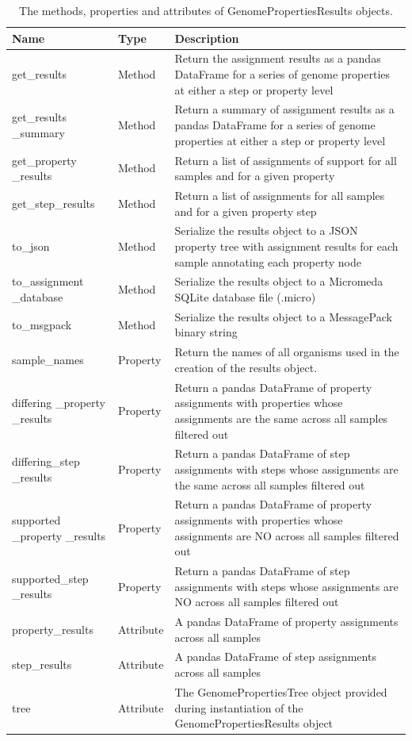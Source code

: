 \begin{longtable}{|p{2.7cm}|p{2cm}|p{10cm}|}
\caption{The methods, properties and attributes of GenomePropertiesResults objects.}
\label{tab:results-object}\\
\hline
\textbf{Name} & \textbf{Type} & \textbf{Description} \\ \hline
\endfirsthead
%
\endhead
%
get\_results & Method & Return the assignment results as a pandas DataFrame for a series of genome properties at either a step or property level \\ \hline
get\_results \_summary & Method & Return a summary of assignment results as a pandas DataFrame for a series of genome properties at either a step or property level \\ \hline
get\_property \_results & Method & Return a list of assignments of support for all samples and for a given property \\ \hline
get\_step\_results & Method & Return a list of assignments for all samples and for a given property step \\ \hline
to\_json & Method & Serialize the results object to a JSON property tree with assignment results for each sample annotating each property node \\ \hline
to\_assignment \_database & Method & Serialize the results object to a Micromeda SQLite database file (.micro) \\ \hline
to\_msgpack & Method & Serialize the results object to a MessagePack binary string \\ \hline
sample\_names & Property & Return the names of all organisms used in the creation of the results object. \\ \hline
differing \_property \_results & Property & Return a pandas DataFrame of property assignments with properties whose assignments are the same across all samples filtered out \\ \hline
differing\_step \_results & Property & Return a pandas DataFrame of step assignments with steps whose assignments are the same across all samples filtered out \\ \hline
supported \_property \_results & Property & Return a pandas DataFrame of property assignments with properties whose assignments are NO across all samples filtered out \\ \hline
supported\_step \_results & Property & Return a pandas DataFrame of step assignments with steps whose assignments are NO across all samples filtered out \\ \hline
property\_results & Attribute & A pandas DataFrame of property assignments across all samples \\ \hline
step\_results & Attribute & A pandas DataFrame of step assignments across all samples \\ \hline
tree & Attribute & The GenomePropertiesTree object provided during instantiation of the GenomePropertiesResults object \\ \hline
\end{longtable}

